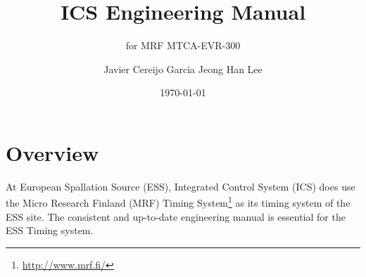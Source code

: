 \documentclass[11pt
  , a4paper
  , article
  , oneside
  , showtrims
]{memoir}
\begin{document}


\date{\today}




\title{ICS Engineering Manual}
\subtitle{for MRF MTCA-EVR-300}
\author{Javier Cereijo Garcia \newline Jeong Han Lee }



\showtrimson

\esstitle
\newpage
\tableofcontents
\newpage



\chapter{Overview}
At European Spallation Source (ESS), Integrated Control System (ICS) does use the Micro Research Finland (MRF) Timing System{\footnote{\url{http://www.mrf.fi/}}} as its timing system of the ESS site. The consistent and up-to-date engineering manual is essential for the ESS Timing system.
\end{document}
